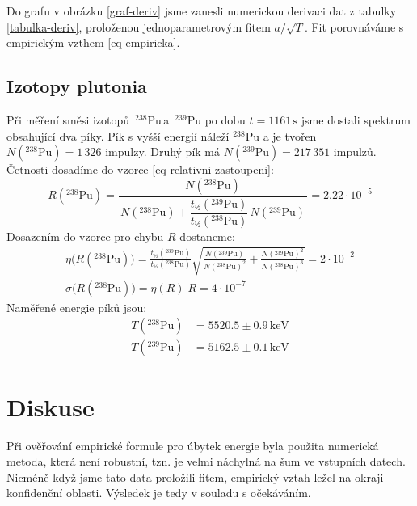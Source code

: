 \documentclass[10pt,a4paper]{article}
\renewcommand{\U}[1]{\ensuremath{\,\mathrm{#1}}}
\newcommand{\°}{\degree}
\begin{document}
Do grafu v obrázku \ref{graf-deriv} jsme zanesli numerickou derivaci dat z tabulky \ref{tabulka-deriv}, proloženou jednoparametrovým fitem $a/\sqrt{T}$. Fit porovnáváme s empirickým vzthem \eqref{eq-empiricka}.

\subsection{Izotopy plutonia}
Při měření směsi izotopů $\,{}^{238}$Pu\;\,a $\,{}^{239}$Pu po dobu $t=1161 \U{s}$ jsme dostali spektrum obsahující dva píky. Pík s vyšší energií náleží $^{238}$Pu a je tvořen $N({}^{238}\text{Pu}) = 1\,326$ impulzy. Druhý pík má $N({}^{239}\text{Pu}) = 217\,351$ impulzů. Četnosti dosadíme do vzorce \eqref{eq-relativni-zastoupeni}:
\begin{equation*}
    R({}^{238}\text{Pu})
    = \frac{N({}^{238}\text{Pu})}{\, N({}^{238}\text{Pu}) +  \dfrac{t_½({}^{239}\text{Pu})}{t_½({}^{238}\text{Pu})} \, N({}^{239}\text{Pu}) \,}
    = 2.22 \cdot 10^{-5}
\end{equation*}
Dosazením do vzorce pro chybu $R$ dostaneme:
\begin{gather*}
    \eta\big(R({}^{238}\text{Pu})\big)
    = \frac{t_½({}^{239}\text{Pu})}{t_½({}^{238}\text{Pu})}
    \sqrt{\frac{N({}^{239}\text{Pu})}{N({}^{238}\text{Pu})^2} + \frac{N({}^{239}\text{Pu})^2}{N({}^{238}\text{Pu})^3}}
    = 2 \cdot 10^{-2}
    \\[5pt]
    \sigma\big(R({}^{238}\text{Pu})\big) = \eta(R) \; R = 4 \cdot 10^{-7}
\end{gather*}
Naměřené energie píků jsou:
\begin{align*}
    T({}^{238}\text{Pu}) &= 5520.5 \pm 0.9 \U{keV} \\
    T({}^{239}\text{Pu}) &= 5162.5 \pm 0.1 \U{keV}
\end{align*}


\pagebreak

\section{Diskuse}
Při ověřování empirické formule pro úbytek energie byla použita numerická metoda, která není robustní, tzn. je velmi náchylná na šum ve vstupních datech. Nicméně když jsme tato data proložili fitem, empirický vztah ležel na okraji konfidenční oblasti. Výsledek je tedy v souladu s očekáváním.
\end{document}

